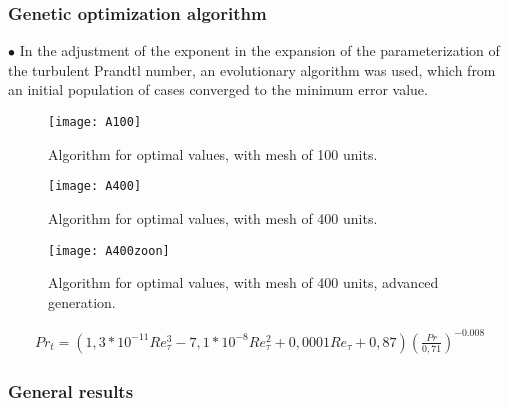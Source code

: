 \documentclass[xcolor=dvipsnames,8pt,aspectratio=34]{beamer}
\begin{document}
		
			\begin{frame}
		\frametitle{Genetic optimization algorithm}
		$\bullet$ In the adjustment of the exponent in the expansion of the parameterization of the turbulent Prandtl number, an evolutionary algorithm was used, which from an initial population of cases converged to the minimum error value.\\ 
		\begin{minipage}[h!]{0.32\textwidth}
			\begin{figure}
				\centering
				\texttt{[image: A100]}
				\caption{Algorithm for optimal values, with mesh of 100 units.}
			\end{figure}
		\end{minipage}
		\begin{minipage}[h!]{0.32\textwidth}
			\begin{figure}
				\centering
				\texttt{[image: A400]}
				\caption{Algorithm for optimal values, with mesh of 400 units.}
			\end{figure}
		\end{minipage}
		\begin{minipage}[h!]{0.32\textwidth}
			\begin{figure}
				\centering
				\texttt{[image: A400zoon]}
				\caption{Algorithm for optimal values, with mesh of 400 units, advanced generation.}
			\end{figure}
		\end{minipage}	
		\begin{equation}
		\begin{split}
		Pr_t = \left( 1,3 * 10^{-11} Re_\tau^3 - 7,1 * 10^{-8} Re_\tau^2 + 0,0001 Re_\tau + 0,87 \right) \left(  \frac{Pr}{0,71}\right) ^{-0.008}
		\end{split}
		\end{equation}	
		\end{frame}	
	
	
	
	
	
		\begin{frame}
		\frametitle{General results}
		\begin{center}
			\animategraphics[trim = {1.7cm 2cm 0 1cm} , scale=1 , loop,controls = true, width=\linewidth]{10}{plot/plot_}{001}{180}
		\end{center}
		\end{frame}
\end{document}
